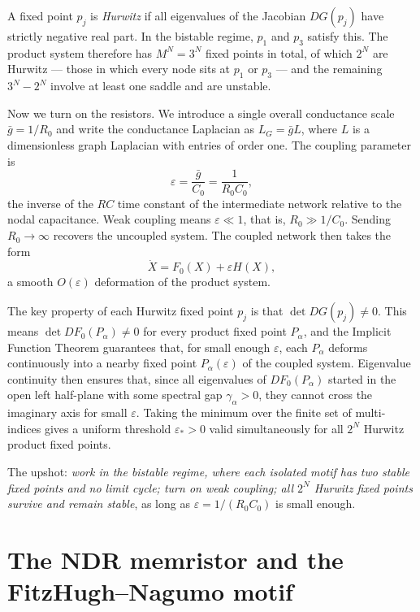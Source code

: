 \documentclass[11pt]{article}
\begin{document}
A fixed point $p_j$ is \emph{Hurwitz} if all eigenvalues of the
Jacobian $DG(p_j)$ have strictly negative real part. In the bistable
regime, $p_1$ and $p_3$ satisfy this. The product system therefore has
$M^N = 3^N$ fixed points in total, of which $2^N$ are Hurwitz --- those
in which every node sits at $p_1$ or $p_3$ --- and the remaining
$3^N - 2^N$ involve at least one saddle and are unstable.

Now we turn on the resistors. We introduce a single overall conductance
scale $\bar{g} = 1/R_0$ and write the conductance Laplacian as
$L_G = \bar{g} L$, where $L$ is a dimensionless graph Laplacian with
entries of order one. The coupling parameter is
\begin{equation}
  \varepsilon = \frac{\bar{g}}{C_0} = \frac{1}{R_0 C_0},
  \label{eq:epsilon_strategy}
\end{equation}
the inverse of the $RC$ time constant of the intermediate network
relative to the nodal capacitance. Weak coupling means $\varepsilon \ll
1$, that is, $R_0 \gg 1/C_0$. Sending $R_0 \to \infty$ recovers the
uncoupled system. The coupled network then takes the form
\begin{equation}
  \dot X = F_0(X) + \varepsilon H(X),
  \label{eq:strategy_coupled}
\end{equation}
a smooth $O(\varepsilon)$ deformation of the product system.

The key property of each Hurwitz fixed point $p_j$ is that
$\det DG(p_j) \neq 0$. This means $\det DF_0(P_\alpha) \neq 0$ for
every product fixed point $P_\alpha$, and the Implicit Function Theorem
guarantees that, for small enough $\varepsilon$, each $P_\alpha$
deforms continuously into a nearby fixed point $P_\alpha(\varepsilon)$
of the coupled system. Eigenvalue continuity then ensures that, since
all eigenvalues of $DF_0(P_\alpha)$ started in the open left half-plane
with some spectral gap $\gamma_\alpha > 0$, they cannot cross the
imaginary axis for small $\varepsilon$. Taking the minimum over the
finite set of multi-indices gives a uniform threshold $\varepsilon_* > 0$
valid simultaneously for all $2^N$ Hurwitz product fixed points.

The upshot: \emph{work in the bistable regime, where each isolated motif
has two stable fixed points and no limit cycle; turn on weak coupling;
all $2^N$ Hurwitz fixed points survive and remain stable}, as long as
$\varepsilon = 1/(R_0 C_0)$ is small enough.


\section{The NDR memristor and the FitzHugh--Nagumo motif}
\label{sec:motif}
\end{document}
